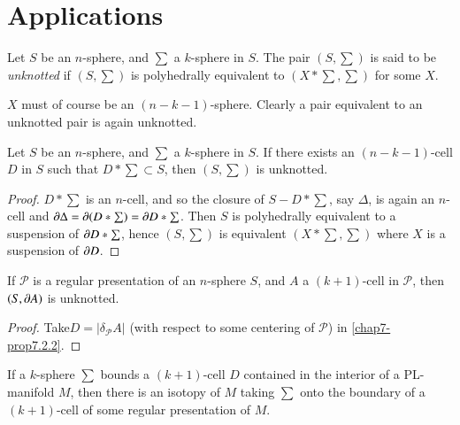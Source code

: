 \section{Applications}\label{chap7-sec7.2}

\begin{definition}\label{chap7-defi7.2.1}
Let $S$ be an $n$-sphere, and $\sum$ a $k$-sphere in $S$. The pair $(S,\sum)$ is said to be {\em unknotted} if $(S,\sum)$ is polyhedrally equivalent to $(X\ast \sum,\sum)$ for some $X$.

$X$ must of course be an $(n-k-1)$-sphere. Clearly a pair equivalent to an unknotted pair is again unknotted.
\end{definition}

\begin{proposition}\label{chap7-prop7.2.2}
Let $S$ be an $n$-sphere, and $\sum$ a $k$-sphere in $S$. If there exists an $(n-k-1)$-cell $D$ in $S$ such that $D\ast \sum \subset S$, then $(S,\sum)$ is unknotted.
\end{proposition}

\begin{proof}
$D\ast \sum$ is an $n$-cell, and so the closure of $S-D\ast\sum$, say $\Delta$, is again an $n$-cell and $\partial \Delta =\partial (D\ast\sum)=\partial D\ast \sum$. Then $S$ is polyhedrally equivalent to a suspension of $\partial D\ast \sum$, hence $(S,\sum)$ is equivalent $(X\ast \sum,\sum)$ where $X$ is a suspension of $\partial D$.
\end{proof}

\begin{corollary}\label{chap7-coro7.2.3}
If $\mathscr{P}$ is a regular presentation of an $n$-sphere $S$, and $A$ a $(k+1)$-cell in $\mathscr{P}$, then $(S,\partial A)$ is unknotted.
\end{corollary}

\begin{proof}
Take\pageoriginale $D=|\delta_{\mathscr{P}}A|$ (with respect to some centering of $\mathscr{P}$) in \ref{chap7-prop7.2.2}.
\end{proof}

\begin{proposition}\label{chap7-prop7.2.4}
If a $k$-sphere $\sum$ bounds a $(k+1)$-cell $D$ contained in the interior of a PL-manifold $M$, then there is an isotopy of $M$ taking $\sum$ onto the boundary of a $(k+1)$-cell of some regular presentation of $M$.
\end{proposition}

